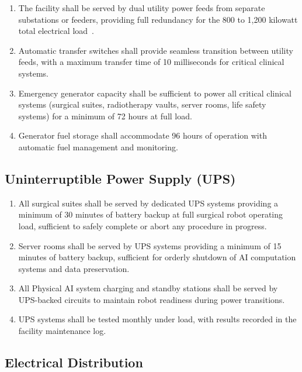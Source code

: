 \documentclass[11pt,letterpaper]{article}
\begin{document}
\begin{enumerate}[label=(\alph*)]
\item The facility shall be served by dual utility power feeds from separate
  substations or feeders, providing full redundancy for the 800 to 1,200
  kilowatt total electrical load~\cite{sitespec2026}.

\item Automatic transfer switches shall provide seamless transition between
  utility feeds, with a maximum transfer time of 10 milliseconds for critical
  clinical systems.

\item Emergency generator capacity shall be sufficient to power all critical
  clinical systems (surgical suites, radiotherapy vaults, server rooms,
  life safety systems) for a minimum of 72 hours at full load.

\item Generator fuel storage shall accommodate 96 hours of operation with
  automatic fuel management and monitoring.
\end{enumerate}

\subsection{Uninterruptible Power Supply (UPS)}

\begin{enumerate}[label=(\alph*)]
\item All surgical suites shall be served by dedicated UPS systems providing a
  minimum of 30 minutes of battery backup at full surgical robot operating
  load, sufficient to safely complete or abort any procedure in progress.

\item Server rooms shall be served by UPS systems providing a minimum of 15
  minutes of battery backup, sufficient for orderly shutdown of AI computation
  systems and data preservation.

\item All Physical AI system charging and standby stations shall be served by
  UPS-backed circuits to maintain robot readiness during power transitions.

\item UPS systems shall be tested monthly under load, with results recorded
  in the facility maintenance log.
\end{enumerate}

\subsection{Electrical Distribution}
\end{document}
